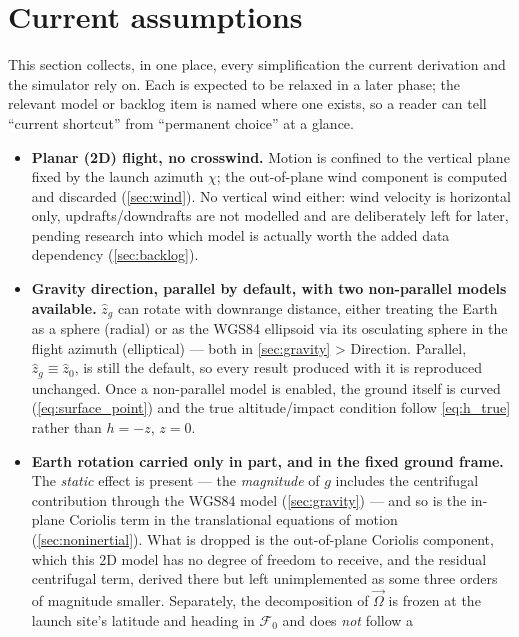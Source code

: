 \documentclass[10pt]{extarticle}
\numberwithin{equation}{subsection}
\begin{document}
\tableofcontents

\newpage
\section{Current assumptions}\label{sec:assumptions}
This section collects, in one place, every simplification the current derivation and the
simulator rely on. Each is expected to be relaxed in a later phase; the relevant model or backlog
item is named where one exists, so a reader can tell ``current shortcut'' from ``permanent
choice'' at a glance.
\begin{itemize}
    \item \textbf{Planar (2D) flight, no crosswind.} Motion is confined to the vertical plane
    fixed by the launch azimuth $\chi$; the out-of-plane wind component is computed and discarded
    (\autoref{sec:wind}). No vertical wind either: wind velocity is horizontal only,
    updrafts/downdrafts are not modelled and are deliberately left for later, pending research
    into which model is actually worth the added data dependency (\autoref{sec:backlog}).
    \item \textbf{Gravity direction, parallel by default, with two non-parallel models
    available.} $\hat{z}_g$ can rotate with downrange distance, either treating the Earth as a
    sphere (radial) or as the WGS84 ellipsoid via its osculating sphere in the flight azimuth
    (elliptical) --- both in \autoref{sec:gravity} > Direction. Parallel, $\hat{z}_g\equiv
    \hat{z}_0$, is still the default, so every result produced with it is reproduced unchanged.
    Once a non-parallel model is enabled, the ground itself is curved
    (\autoref{eq:surface_point}) and the true altitude/impact condition follow
    \autoref{eq:h_true} rather than $h=-z$, $z=0$.
    \item \textbf{Earth rotation carried only in part, and in the fixed ground frame.} The
    \emph{static} effect is present --- the \emph{magnitude} of $g$ includes the centrifugal
    contribution through the WGS84 model (\autoref{sec:gravity}) --- and so is the in-plane
    Coriolis term in the translational equations of motion (\autoref{sec:noninertial}). What is
    dropped is the out-of-plane Coriolis component, which this 2D model has no degree of freedom
    to receive, and the residual centrifugal term, derived there but left unimplemented as some
    three orders of magnitude smaller. Separately, the decomposition of $\vec{\Omega}$ is frozen
    at the launch site's latitude and heading in $\mathcal{F}_0$ and does \emph{not} follow a

\end{itemize}
\end{document}
